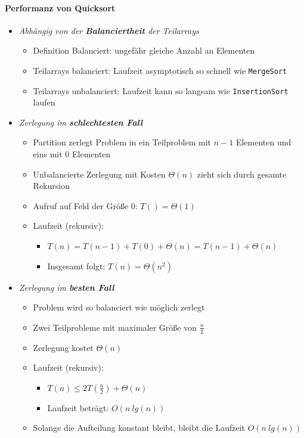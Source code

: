 \documentclass[
    ngerman,
    color=3b,
    dark_mode,
    load_common, %
    summary,
    boxarc,
]{rubos-tuda-template}
\begin{document}
\paragraph{Performanz von Quicksort}
\begin{itemize}
    \item \textit{Abhängig von der \textbf{Balanciertheit} der Teilarrays}
          \begin{itemize}
              \item Definition Balanciert: ungefähr gleiche Anzahl an Elementen
              \item Teilarrays balanciert: Laufzeit asymptotisch so schnell wie \texttt{MergeSort}
              \item Teilarrays unbalanciert: Laufzeit kann so langsam wie \texttt{InsertionSort} laufen
          \end{itemize}

    \item \textit{Zerlegung im \textbf{schlechtesten Fall}}
          \begin{itemize}
              \item Partition zerlegt Problem in ein Teilproblem mit $n-1$ Elementen und eins mit $0$ Elementen
              \item Unbalancierte Zerlegung mit Kosten $\Theta(n)$ zieht sich durch gesamte Rekursion
              \item Aufruf auf Feld der Grö\ss{}e 0: $T() = \Theta(1)$
              \item Laufzeit (rekursiv):
                    \begin{itemize}
                        \item $T(n) = T(n-1) + T(0) + \Theta(n) = T(n-1) + \Theta(n)$
                        \item Insgesamt folgt: $T(n) = \Theta(n^2)$
                    \end{itemize}
          \end{itemize}

    \item \textit{Zerlegung im \textbf{besten Fall}}
          \begin{itemize}
              \item Problem wird so balanciert wie möglich zerlegt
              \item Zwei Teilprobleme mit maximaler Grö\ss{}e von $\frac{n}{2}$
              \item Zerlegung kostet $\Theta(n)$
              \item Laufzeit (rekursiv):
                    \begin{itemize}
                        \item $T(n) \leq 2T(\frac{n}{2}) + \Theta(n)$
                        \item Laufzeit beträgt: $O(n~lg(n))$
                    \end{itemize}
              \item Solange die Aufteilung konstant bleibt, bleibt die Laufzeit $O(n~lg(n))$
          \end{itemize}

\end{itemize}
\clearpage
\end{document}

